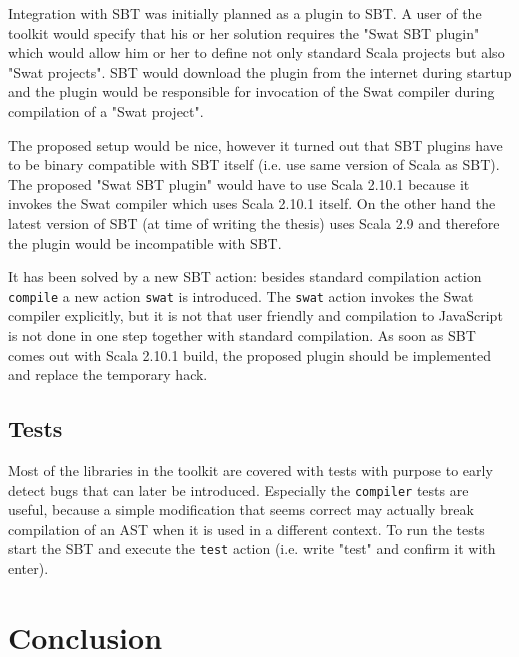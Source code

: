 \documentclass[12pt,a4paper]{report}
\begin{document}
Integration with SBT was initially planned as a plugin to SBT. A user of the toolkit would specify that his or her solution requires the "Swat SBT plugin" which would allow him or her to define not only standard Scala projects but also "Swat projects". SBT would download the plugin from the internet during startup and the plugin would be responsible for invocation of the Swat compiler during compilation of a "Swat project". 

The proposed setup would be nice, however it turned out that SBT plugins have to be binary compatible with SBT itself (i.e. use same version of Scala as SBT). The proposed "Swat SBT plugin" would have to use Scala 2.10.1 because it invokes the Swat compiler which uses Scala 2.10.1 itself. On the other hand the latest version of SBT (at time of writing the thesis) uses Scala 2.9 and therefore the plugin would be incompatible with SBT.

It has been solved by a new SBT action: besides standard compilation action \texttt{compile} a new action \texttt{swat} is introduced. The \texttt{swat} action invokes the Swat compiler explicitly, but it is not that user friendly and compilation to JavaScript is not done in one step together with standard compilation. As soon as SBT comes out with Scala 2.10.1 build, the proposed plugin should be implemented and replace the temporary hack.

\section{Tests}

Most of the libraries in the toolkit are covered with tests with purpose to early detect bugs that can later be introduced. Especially the \texttt{compiler} tests are useful, because a simple modification that seems correct may actually break compilation of an AST when it is used in a different context. To run the tests start the SBT and execute the \texttt{test} action (i.e. write "test" and confirm it with enter).



\chapter{Conclusion}
\end{document}
